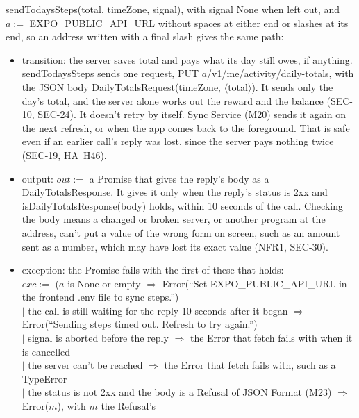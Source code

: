 \documentclass[12pt, titlepage]{article}
\begin{document}
{\raggedright
\noindent sendTodaysSteps(total, timeZone, signal), with signal None when left
out, and $a :=$ EXPO\_PUBLIC\_API\_URL without spaces at either end or slashes
at its end, so an address written with a final slash gives the same path:\par}
\begin{itemize}
\item transition: the server saves total and pays what its day still owes, if
  anything. sendTodaysSteps sends one request, PUT
  $a$/v1/me/activity/daily-totals, with the JSON body
  DailyTotalsRequest(timeZone, $\langle$total$\rangle$). It sends only the
  day's total, and the server alone works out the reward and the balance
  (SEC-10, SEC-24). It doesn't retry by itself. Sync Service (M20) sends it
  again on the next refresh, or when the app comes back to the foreground.
  That is safe even if an earlier call's reply was lost, since the server pays
  nothing twice (SEC-19, HA~H46).
\item output: $out :=$ a Promise that gives the reply's body as a
  DailyTotalsResponse. It gives it only when the reply's status is 2xx and
  isDailyTotalsResponse(body) holds, within 10 seconds of the call. Checking
  the body means a changed or broken server, or another program at the
  address, can't put a value of the wrong form on screen, such as an amount
  sent as a number, which may have lost its exact value (NFR1, SEC-30).
\item exception: the Promise fails with the first of these that holds:\\
  \hspace*{1em}$exc :=$ ($a$ is None or empty $\Rightarrow$ Error(``Set
  EXPO\_PUBLIC\_API\_URL in the frontend .env file to sync steps.'')\\
  \hspace*{1em}$|$ the call is still waiting for the reply 10 seconds after
  it began $\Rightarrow$
  Error(``Sending steps timed out. Refresh to try again.'')\\
  \hspace*{1em}$|$ signal is aborted before the reply $\Rightarrow$ the Error
  that fetch fails with when it is cancelled\\
  \hspace*{1em}$|$ the server can't be reached $\Rightarrow$ the Error that
  fetch fails with, such as a TypeError\\
  \hspace*{1em}$|$ the status is not 2xx and the body is a Refusal of JSON
  Format (M23) $\Rightarrow$ Error($m$), with $m$ the Refusal's

\end{itemize}
\end{document}
